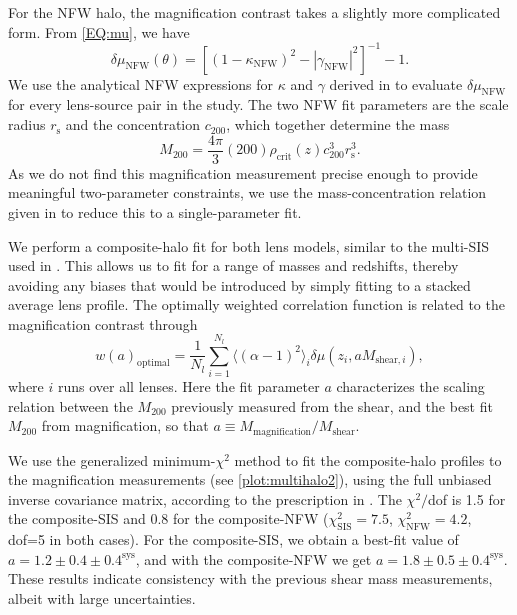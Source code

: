 For the \ac{NFW} halo, the magnification contrast takes a slightly more complicated form. From \autoref{EQ:mu}, we have
\begin{equation}
\delta\mu_{\text{NFW}}(\theta)=\left[ (1-\kappa_{\text{NFW}})^2 - \left|\gamma_{\text{NFW}}\right|^2 \right]^{-1} -1.
\end{equation}
We use the analytical \ac{NFW} expressions for $\kappa$ and $\gamma$ derived in \citet{Wright00} to evaluate $\delta\mu_{\text{NFW}}$ for every lens-source pair in the study. The two \ac{NFW} fit parameters are the scale radius $r_{\text{s}}$ and the concentration $c_{200}$, which together determine the mass
\begin{equation}
M_{200}=\frac{4\pi}{3}(200)\rho_{\text{crit}}(z)c_{200}^3r_{\text{s}}^3 .
\end{equation}
As we do not find this magnification measurement precise enough to provide meaningful two-parameter constraints, we use the mass-concentration relation given in \citet{Munoz11} to reduce this to a single-parameter fit.

We perform a composite-halo fit for both lens models, similar to the multi-\ac{SIS} used in \citet{Hildebrandt11}. This allows us to fit for a range of masses and redshifts, thereby avoiding any biases that would be introduced by simply fitting to a stacked average lens profile. The optimally weighted correlation function is related to the magnification contrast through
\begin{equation}
w(a)_{\text{optimal}}= \frac{1}{N_{l}}\sum_{i=1}^{N_{l}} \langle (\alpha -1)^2 \rangle_i \delta \mu(z_i, aM_{\text{shear},i}),
\end{equation}
where $i$ runs over all lenses. Here the fit parameter $a$ characterizes the scaling relation between the $M_{200}$ previously measured from the shear, and the best fit $M_{200}$ from magnification, so that $a \equiv M_{\text{magnification}}/M_{\text{shear}}$. 

We use the generalized minimum-$\chi^2$ method to fit the composite-halo profiles to the magnification measurements (see \autoref{plot:multihalo2}), using the full unbiased inverse covariance matrix, according to the prescription in \citet{Hartlap07}. The $\chi^2/$dof is 1.5 for the composite-\ac{SIS} and 0.8 for the composite-\ac{NFW} ($\chi_{\text{SIS}}^2=7.5$, $\chi_{\text{NFW}}^2=4.2$, dof=5 in both cases). For the composite-\ac{SIS}, we obtain a best-fit value of $a=1.2 \pm 0.4 \pm 0.4^{\text{sys}}$, and with the composite-\ac{NFW} we get $a=1.8 \pm 0.5 \pm 0.4^{\text{sys}}$. These results indicate consistency with the previous shear mass measurements, albeit with large uncertainties.

